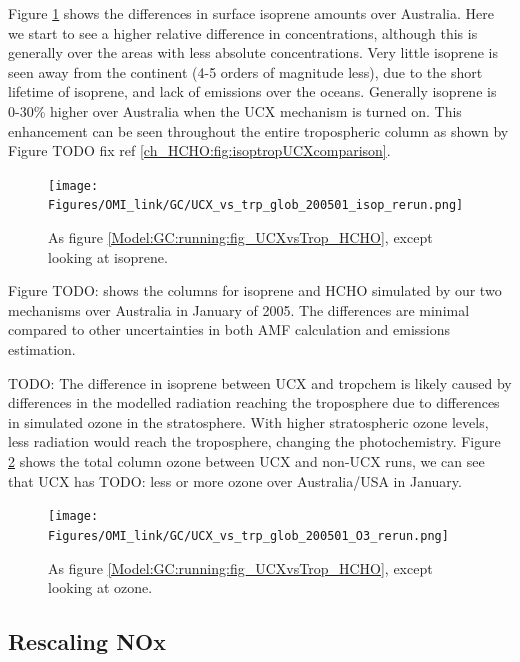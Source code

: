       Figure \ref{Model:GC:running:fig_UCXvsTrop_Isop} shows the differences in surface isoprene amounts over Australia.
      Here we start to see a higher relative difference in concentrations, although this is generally over the areas with less absolute concentrations. 
      Very little isoprene is seen away from the continent (4-5 orders of magnitude less), due to the short lifetime of isoprene, and lack of emissions over the oceans.
      Generally isoprene is 0-30\% higher over Australia when the UCX mechanism is turned on.
      This enhancement can be seen throughout the entire tropospheric column as shown by Figure TODO fix ref \ref{ch_HCHO:fig:isoptropUCXcomparison}. %
      \begin{figure}%
        \texttt{[image: Figures/OMI\_link/GC/UCX\_vs\_trp\_glob\_200501\_isop\_rerun.png]}
        \caption{ %
          As figure \ref{Model:GC:running:fig_UCXvsTrop_HCHO}, except looking at isoprene. 
        }      
        \label{Model:GC:running:fig_UCXvsTrop_Isop}
      \end{figure}
      
      
      Figure TODO: shows the columns for isoprene and HCHO simulated by our two mechanisms over Australia in January of 2005.
      The differences are minimal compared to other uncertainties in both AMF calculation and emissions estimation.
      
      
      TODO: The difference in isoprene between UCX and tropchem is likely caused by differences in the modelled radiation reaching the troposphere due to differences in simulated ozone in the stratosphere.
      With higher stratospheric ozone levels, less radiation would reach the troposphere, changing the photochemistry.
      Figure \ref{Model:GC:running:fig_UCXvsTrop_O3} shows the total column ozone between UCX and non-UCX runs, we can see that UCX has TODO: less or more ozone over Australia/USA in January.
          
      \begin{figure}%
        \texttt{[image: Figures/OMI\_link/GC/UCX\_vs\_trp\_glob\_200501\_O3\_rerun.png]}
        \caption{%
          As figure \ref{Model:GC:running:fig_UCXvsTrop_HCHO}, except looking at ozone. 
        }
        \label{Model:GC:running:fig_UCXvsTrop_O3}
      \end{figure}

  \subsection{Rescaling NOx}
    
